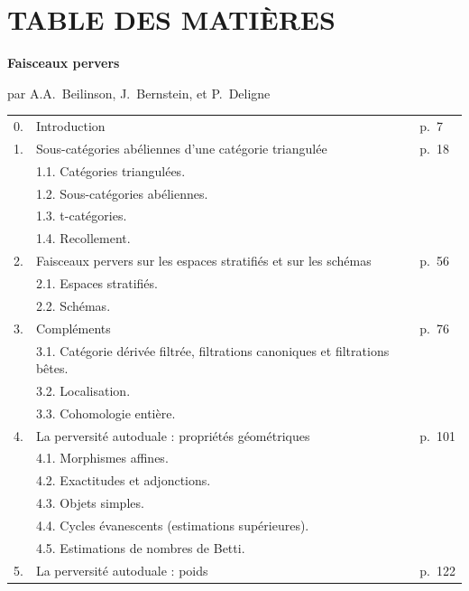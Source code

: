 \documentclass[12pt,a4paper]{article}
\theoremstyle{plain}
\theoremstyle{definition}
\theoremstyle{remark}
\begin{document}
\thispagestyle{empty}
\section*{TABLE DES MATIÈRES}

\noindent
\textbf{Faisceaux pervers}

par A.A.~Beilinson, J.~Bernstein, et P.~Deligne

\vspace{0.5cm}
\begin{tabular}{@{}llp{3cm}l@{}}
0. & Introduction & \dotfill & p.~7 \\[1ex]
1. & Sous-catégories abéliennes d'une catégorie triangulée & \dotfill & p.~18 \\[0.5ex]
& 1.1. Catégories triangulées. & & \\[0.5ex]
& 1.2. Sous-catégories abéliennes. & & \\[0.5ex]
& 1.3. t-catégories. & & \\[0.5ex]
& 1.4. Recollement. & & \\[1ex]
2. & Faisceaux pervers sur les espaces stratifiés et sur les schémas & \dotfill & p.~56 \\[0.5ex]
& 2.1. Espaces stratifiés. & & \\[0.5ex]
& 2.2. Schémas. & & \\[1ex]
3. & Compléments & \dotfill & p.~76 \\[0.5ex]
& 3.1. Catégorie dérivée filtrée, filtrations canoniques et filtrations bêtes. & & \\[0.5ex]
& 3.2. Localisation. & & \\[0.5ex]
& 3.3. Cohomologie entière. & & \\[1ex]
4. & La perversité autoduale : propriétés géométriques & \dotfill & p.~101 \\[0.5ex]
& 4.1. Morphismes affines. & & \\[0.5ex]
& 4.2. Exactitudes et adjonctions. & & \\[0.5ex]
& 4.3. Objets simples. & & \\[0.5ex]
& 4.4. Cycles évanescents (estimations supérieures). & & \\[0.5ex]
& 4.5. Estimations de nombres de Betti. & & \\[1ex]
5. & La perversité autoduale : poids & \dotfill & p.~122 \\[0.5ex]

\end{tabular}
\end{document}
